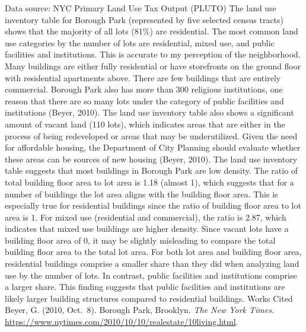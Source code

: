 \documentclass[
  11pt,
  landscape]{article}
\begin{document}
Data source: NYC Primary Land Use Tax Output (PLUTO) \newpage
\onehalfspacing The land use inventory table for Borough Park
(represented by five selected census tracts) shows that the majority of
all lots (81\%) are residential. The most common land use categories by
the number of lots are residential, mixed use, and public facilities and
institutions. This is accurate to my perception of the neighborhood.
Many buildings are either fully residential or have storefronts on the
ground floor with residential apartments above. There are few buildings
that are entirely commercial. Borough Park also has more than 300
religious institutions, one reason that there are so many lots under the
category of public facilities and institutions (Beyer, 2010). The land
use inventory table also shows a significant amount of vacant land (110
lots), which indicates areas that are either in the process of being
redeveloped or areas that may be underutilized. Given the need for
affordable housing, the Department of City Planning should evaluate
whether these areas can be sources of new housing (Beyer, 2010).
\newline \newline The land use inventory table suggests that most
buildings in Borough Park are low density. The ratio of total building
floor area to lot area is 1.18 (almost 1), which suggests that for a
number of buildings the lot area aligns with the building floor area.
This is especially true for residential buildings since the ratio of
building floor area to lot area is 1. For mixed use (residential and
commercial), the ratio is 2.87, which indicates that mixed use buildings
are higher density. Since vacant lots have a building floor area of 0,
it may be slightly misleading to compare the total building floor area
to the total lot area. For both lot area and building floor area,
residential buildings comprise a smaller share than they did when
analyzing land use by the number of lots. In contrast, public facilities
and institutions comprise a larger share. This finding suggests that
public facilities and institutions are likely larger building structures
compared to residential buildings. \newline \singlespacing Works Cited
\newline Beyer, G. (2010, Oct.~8). Borough Park, Brooklyn.
\textit{The New York Times.}
\url{https://www.nytimes.com/2010/10/10/realestate/10living.html}.
\end{document}
